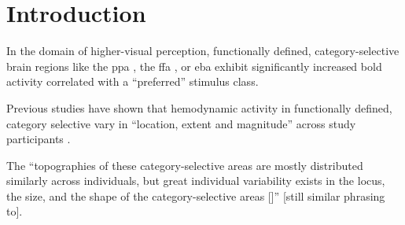 




\section{Introduction}

In the domain of higher-visual perception, functionally defined,
category-selective brain regions like the \ac{ppa} \citep{epstein1998ppa}, the
\ac{ffa} \citep{kanwisher1997ffa}, or \ac{eba} \citep{downing2001bodyarea}
exhibit significantly increased \ac{bold} activity correlated with a
``preferred'' \citep{debeck2008interpreting} stimulus class.


Previous studies have shown that hemodynamic activity in functionally defined,
category selective vary in ``location, extent and magnitude'' across study
participants \citep{rosenke2021probabilistic, frost2012measuring,
zhen2017quantifying, zhen2015quantifying}.

The ``topographies of these category-selective areas are mostly distributed
similarly across individuals, but great individual variability exists in the
locus, the size, and the shape of the category-selective areas
[\citep{rosenke2021probabilistic, zhen2017quantifying, zhen2015quantifying,
frost2012measuring}]'' [still similar phrasing to\citep{jiahui2020predicting}].


